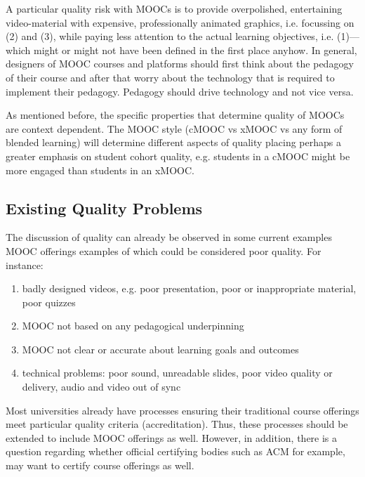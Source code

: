 A particular quality risk with MOOCs is to provide overpolished,
entertaining video-material with expensive, professionally animated
graphics, i.e. focussing on (2) and (3), while paying less attention to
the actual learning objectives, i.e. (1)---which might or might not have
been defined in the first place anyhow. In general, designers of MOOC
courses and platforms should first think about the pedagogy of their
course and after that worry about the technology that is required to
implement their pedagogy. Pedagogy should drive technology and not vice
versa.

As mentioned before, the specific properties that determine quality of
MOOCs are context dependent. The MOOC style (cMOOC vs xMOOC vs any form
of blended learning) will determine different aspects of quality placing
perhaps a greater emphasis on student cohort quality, e.g. students in a
cMOOC might be more engaged than students in an xMOOC.


\subsection{Existing Quality Problems}

The discussion of quality can already be observed in some current
examples MOOC offerings examples of which could be considered poor
quality. For instance:

\begin{enumerate}

\item badly designed videos, e.g. poor presentation, poor or inappropriate
material, poor quizzes

\item MOOC not based on any pedagogical
underpinning 

\item MOOC not clear or accurate about learning goals and
outcomes

\item technical problems: poor sound, unreadable slides, poor
video quality or delivery, audio and video out of sync

\end{enumerate}




Most universities already have processes ensuring their traditional
course offerings meet particular quality criteria (accreditation). Thus,
these processes should be extended to include MOOC offerings as
well. However, in addition, there is a question regarding whether
official certifying bodies such as ACM for example, may want to certify
course offerings as well.
